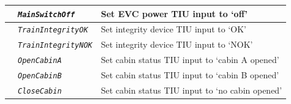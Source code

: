 \documentclass{template/openetcs}
\begin{document}
\begin{itemize}
\begin{longtable}{|l|l|l|}
			\hline
			
			&	\begin{minipage}[t]{0.40\linewidth} \emph{\texttt{MainSwitchOff}} \end{minipage}
			&	\begin{minipage}[t]{0.38\linewidth} Set EVC power TIU input to ‘off’\end{minipage} \\
			
			\hline
			
			&	\begin{minipage}[t]{0.40\linewidth} \emph{\texttt{TrainIntegrityOK}} \end{minipage}
			&	\begin{minipage}[t]{0.38\linewidth} Set integrity device TIU input to ‘OK’ \end{minipage}\\
			
			\hline
			
			&	\begin{minipage}[t]{0.40\linewidth} \emph{\texttt{TrainIntegrityNOK}} \end{minipage}
			&	\begin{minipage}[t]{0.38\linewidth} Set integrity device TIU input to ‘NOK’ \end{minipage} \\
			
			\hline
			
			&	\begin{minipage}[t]{0.40\linewidth} \emph{\texttt{OpenCabinA}} \end{minipage}
			&	\begin{minipage}[t]{0.38\linewidth} Set cabin status TIU input to ‘cabin A opened’ \end{minipage} \\
			
			\hline
			
			&	\begin{minipage}[t]{0.40\linewidth} \emph{\texttt{OpenCabinB}} \end{minipage}
			&	\begin{minipage}[t]{0.38\linewidth} Set cabin status TIU input to ‘cabin B opened’ \end{minipage} \\
			
			\hline
			
			&	\begin{minipage}[t]{0.40\linewidth} \emph{\texttt{CloseCabin}} \end{minipage}
			&	\begin{minipage}[t]{0.38\linewidth} Set cabin status TIU input to ‘no cabin opened’ \end{minipage} \\
			

\end{longtable}
\end{itemize}
\end{document}
